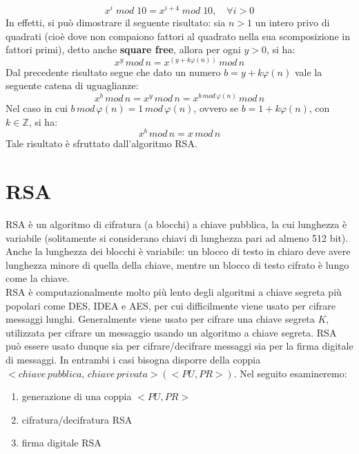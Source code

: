 \begin{equation}
x^i \; mod \; 10 = x^{i + 4} \; mod \; 10, \quad \forall i>0
\end{equation}
In effetti, si può dimostrare il seguente risultato: sia $n > 1$ un intero privo di quadrati (cioè dove non compaiono fattori al quadrato nella sua scomposizione in fattori primi), detto anche \textbf{square free}, allora per ogni $y > 0$, si ha: 
\begin{equation}
x^y \, mod \, n = x^{(y + k\varphi(n) )} \, mod \, n
\end{equation} 
Dal precedente risultato segue che dato un numero $b = y + k\varphi(n)$ vale la seguente catena di uguaglianze:
\[
x^{b} \, mod \, n = x^{y} \, mod \, n = x^{b \, mod \, \varphi(n)} \, mod \, n
\]
Nel caso in cui $ b \, mod \, \varphi(n) = 1 \, mod \, \varphi(n) $, ovvero se $b = 1 + k \varphi(n) $, con $k \in \mathbb{Z}$, si ha:
\begin{equation}
x^b \, mod \, n = x \, mod \, n
\end{equation}
Tale risultato è sfruttato dall'algoritmo RSA.

\section{RSA}

RSA è un algoritmo di cifratura (a blocchi) a chiave pubblica, la cui lunghezza è variabile (solitamente si considerano chiavi di lunghezza pari ad almeno 512 bit). Anche la lunghezza dei blocchi è variabile: un blocco di testo in chiaro deve avere lunghezza minore di quella della chiave, mentre un blocco di testo cifrato è lungo come la chiave. \\
RSA è computazionalmente molto più lento degli algoritmi a chiave segreta più popolari come DES, IDEA e AES, per cui difficilmente viene usato per cifrare messaggi lunghi. Generalmente viene usato per cifrare una chiave segreta $K$, utilizzata per cifrare un messaggio usando un algoritmo a chiave segreta. RSA può essere usato dunque sia per cifrare/decifrare messaggi sia per la firma digitale di messaggi. In entrambi i casi bisogna disporre della coppia $<chiave \, pubblica, \,  chiave \, privata>(<PU,PR>)$. Nel seguito esamineremo:
\begin{enumerate}
\item generazione di una coppia $<PU,PR>$
\item cifratura/decifratura RSA
\item firma digitale RSA
\end{enumerate}

